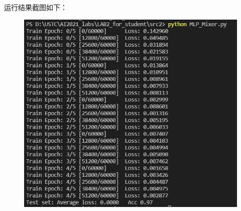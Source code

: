 \documentclass{ctexart}
\begin{document}
\par 运行结果截图如下：
\begin{figure}[H]
    \centering
    \includegraphics[scale=0.5]{MLPMixer.png}

\end{figure}
\end{document}
